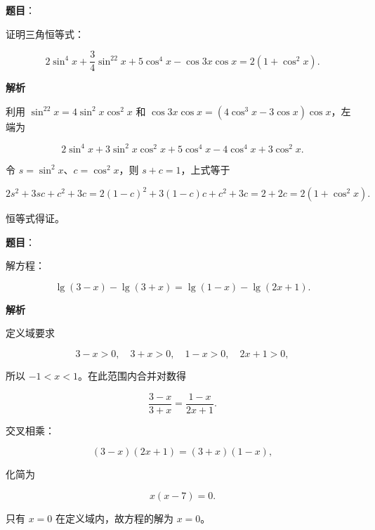 \begin{answer}

\textbf{题目}：

证明三角恒等式：

\nopagebreak[4]
\[
2\sin^4x+\frac34\sin^22x+5\cos^4x-\cos3x\cos x
=2(1+\cos^2x).
\]

\textbf{解析}

利用 $\sin^22x=4\sin^2x\cos^2x$ 和
$\cos3x\cos x=(4\cos^3x-3\cos x)\cos x$，左端为

\nopagebreak[4]
\[
2\sin^4x+3\sin^2x\cos^2x+5\cos^4x-4\cos^4x+3\cos^2x.
\]

令 $s=\sin^2x$、$c=\cos^2x$，则 $s+c=1$，上式等于

\nopagebreak[4]
\[
2s^2+3sc+c^2+3c
=2(1-c)^2+3(1-c)c+c^2+3c
=2+2c
=2(1+\cos^2x).
\]

恒等式得证。


\end{answer}
\begin{answer}

\textbf{题目}：

解方程：

\nopagebreak[4]
\[
\lg(3-x)-\lg(3+x)=\lg(1-x)-\lg(2x+1).
\]

\textbf{解析}

定义域要求

\nopagebreak[4]
\[
3-x>0,\quad 3+x>0,\quad 1-x>0,\quad 2x+1>0,
\]

所以 $-1<x<1$。在此范围内合并对数得

\nopagebreak[4]
\[
\frac{3-x}{3+x}=\frac{1-x}{2x+1}.
\]

交叉相乘：

\nopagebreak[4]
\[
(3-x)(2x+1)=(3+x)(1-x),
\]

化简为

\nopagebreak[4]
\[
x(x-7)=0.
\]

只有 $x=0$ 在定义域内，故方程的解为 $x=0$。


\end{answer}
